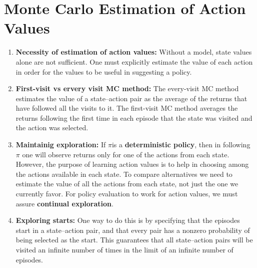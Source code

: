 \section{Monte Carlo Estimation of Action Values}
\begin{enumerate}
	\item \textbf{Necessity of estimation of action values:} Without a model, state values alone are not sufficient. One must explicitly estimate the value of each action in order for the values to be useful in suggesting a policy.

	\item \textbf{First-visit vs ervery visit MC method:} The every-visit MC method estimates the value of a state–action pair as the average of the returns that have followed all the visits to it. The first-visit MC method averages the returns following the first time in each episode that the state was visited and the action was selected.

	\item \textbf{Maintainig exploration:}  If $\pi$is a \textbf{deterministic policy}, then in following $\pi$ one will observe returns only for one of the actions from each state. However, the purpose of learning action values is to help in choosing among the actions available in each state. To compare alternatives we need to estimate the value of all the actions from each state, not just the one we currently favor. For policy evaluation to work for action values, we must assure \textbf{continual exploration}.

	\item \textbf{Exploring starts:} One way to do this is by specifying that the episodes start in a state–action pair, and that every pair has a nonzero probability of being selected as the start. This guarantees that all state–action pairs will be visited an infinite number of times in the limit of an infinite number of episodes.
\end{enumerate}

